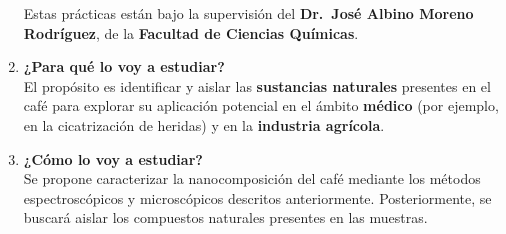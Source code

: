 \documentclass{article}
\begin{document}
\begin{multicols}{2}
\begin{enumerate}[label={{\textcolor{trueblue}{\textbf{Ej}. \arabic*.0}}}, start=2]
    Estas prácticas están bajo la supervisión del \textbf{Dr.~José Albino Moreno Rodríguez}, de la \textbf{Facultad de Ciencias Químicas}.

    \item \textbf{¿Para qué lo voy a estudiar?}\\[4pt]
    El propósito es identificar y aislar las \textbf{sustancias naturales} presentes en el café para explorar su aplicación potencial en el ámbito \textbf{médico} (por ejemplo, en la cicatrización de heridas) y en la \textbf{industria agrícola}.

    \item \textbf{¿Cómo lo voy a estudiar?}\\[4pt]
    Se propone caracterizar la nanocomposición del café mediante los métodos espectroscópicos y microscópicos descritos anteriormente.  
    Posteriormente, se buscará aislar los compuestos naturales presentes en las muestras.
\end{enumerate}

\end{multicols}
\end{document}
